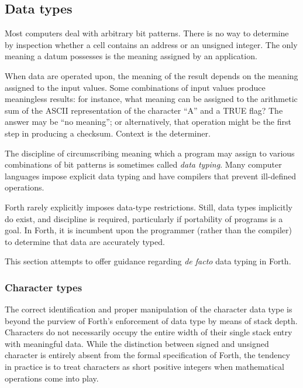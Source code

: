 \subsection{Data types} %
\label{rat:types}

Most computers deal with arbitrary bit patterns. There is no way to
determine by inspection whether a cell contains an address or an
unsigned integer. The only meaning a datum possesses is the meaning
assigned by an application.

When data are operated upon, the meaning of the result depends on
the meaning assigned to the input values. Some combinations of input
values produce meaningless results: for instance, what meaning can
be assigned to the arithmetic sum of the ASCII representation of the
character ``A'' and a TRUE flag? The answer may be ``no meaning'';
or alternatively, that operation might be the first step in
producing a checksum. Context is the determiner.

The discipline of circumscribing meaning which a program may assign
to various combinations of bit patterns is sometimes called
\emph{data typing}. Many computer languages impose explicit data
typing and have compilers that prevent ill-defined operations.

Forth rarely explicitly imposes data-type restrictions. Still, data
types implicitly do exist, and discipline is required, particularly
if portability of programs is a goal. In Forth, it is incumbent upon
the programmer (rather than the compiler) to determine that data are
accurately typed.

This section attempts to offer guidance regarding \emph{de facto}
data typing in Forth.

\setcounter{subsubsection}{1}
\subsubsection{Character types} %

The correct identification and proper manipulation of the character
data type is beyond the purview of Forth's enforcement of data type
by means of stack depth. Characters do not necessarily occupy the
entire width of their single stack entry with meaningful data. While
the distinction between signed and unsigned character is entirely
absent from the formal specification of Forth, the tendency in
practice is to treat characters as short positive integers when
mathematical operations come into play.


